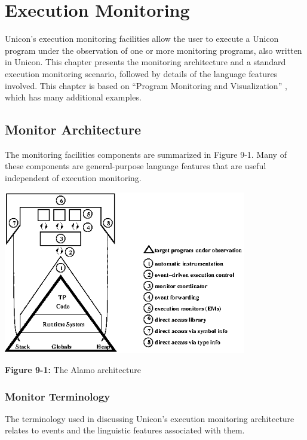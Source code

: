 \chapter{Execution Monitoring}

Unicon's execution monitoring facilities allow the user to execute a Unicon
program under the observation of one or more monitoring programs, also
written in Unicon.  This chapter presents the monitoring architecture and a
standard execution monitoring scenario, followed by details of the language
features involved.  This chapter is based on ``Program Monitoring and
Visualization'' \cite{Jeffery99}, which has many additional examples.

\section{Monitor Architecture}

The monitoring facilities components are summarized in Figure 9-1.
Many of these components are general-purpose language features that are
useful independent of execution monitoring.

\begin{center}
\includegraphics[height=2.8in]{alamarch.png}
\end{center}

{\sffamily\bfseries Figure 9-1:}
{\sffamily The Alamo architecture}

\bigskip

\subsection{Monitor Terminology}

The terminology used in discussing Unicon's execution monitoring
architecture relates to events and the linguistic features associated with
them.




